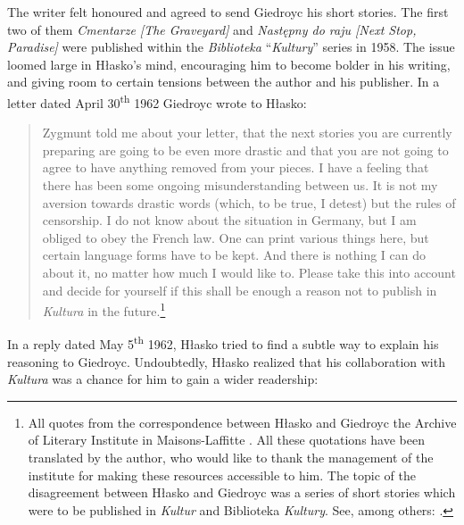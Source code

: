 \begin{paper}
The writer felt honoured and agreed to send Giedroyc his short stories.
The first two of them \emph{Cmentarze [The Graveyard]} and
\emph{Następny do raju [Next Stop, Paradise]} were published
within the \emph{Biblioteka }``\emph{Kultury}'' series in 1958. The
issue loomed large in Hłasko's mind, encouraging him to become bolder in his writing, and giving room to 
certain tensions between the author and his publisher. In a
letter dated April 30\textsuperscript{th} 1962 Giedroyc wrote to Hłasko:

\begin{quote}
 Zygmunt told me about your letter, that the next stories you are
currently preparing are going to be even more drastic and that you are
not going to agree to have anything removed from your pieces. I have a
feeling that there has been some ongoing misunderstanding between us. It
is not my aversion towards drastic words (which, to be true, I detest)
but the rules of censorship. I do not know about the situation in
Germany, but I am obliged to obey the French law. One can print various
things here, but certain language forms have to be kept. And there is
nothing I can do about it, no matter how much I would like to. Please
take this into account and decide for yourself if this shall be enough a
reason not to publish in \emph{Kultura} in the future.\footnote{All quotes from the correspondence between Hłasko and Giedroyc the Archive of Literary
  Institute in Maisons-Laffitte \citep{hlasko_kor_1962}. All  these quotations have been translated by the author, who would like to thank the management of
  the institute for making these resources accessible to him. The topic of the disagreement between Hłasko and Giedroyc was a series of short stories which were to be published in
  \emph{Kultur} and Biblioteka \emph{Kultury}. See, among others: \citealt{hlasko_w_1962,hlasko_drugie_1965,hlasko_wszyscy_1965}.}
  \begin{flushright}
  \citep{hlasko_kor_1962}
  \end{flushright}
\end{quote}

\noindent In a reply dated May 5\textsuperscript{th}
1962, Hłasko tried to find a subtle way to explain his reasoning to Giedroyc. Undoubtedly, Hłasko realized that his collaboration with \emph{Kultura} was
a chance for him to gain a wider readership:


\end{paper}
